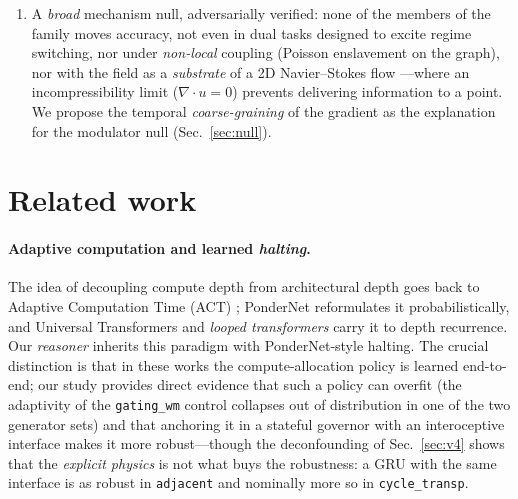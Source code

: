 \documentclass{article}
\begin{document}
\begin{enumerate}
        first campaign ($n{=}10$) in which the OOD compute-robustness effect
        survives a paired re-run with learnable physics after a
        numerical-precision bug (BF16 freezing), and a twenty-seed
        \emph{deconfounding} campaign that bounds the claim---at equalized caps
        the order effect holds in one generator family and not the other, and a
        matched-interface GRU governor attains it too
        (Secs.~\ref{sec:exp},~\ref{sec:v4}).
  \item A \emph{broad} mechanism null, adversarially verified: none of the members
        of the family moves accuracy, not even in dual tasks designed to excite
        regime switching, nor under \emph{non-local} coupling (Poisson
        enslavement on the graph), nor with the field as a \emph{substrate} of a
        2D Navier--Stokes flow ---where an incompressibility limit
        ($\nabla\!\cdot u{=}0$) prevents delivering information to a point.
        We propose the temporal \emph{coarse-graining} of the gradient as the
        explanation for the modulator null (Sec.~\ref{sec:null}).
\end{enumerate}

\section{Related work}
\label{sec:related}

\paragraph{Adaptive computation and learned \emph{halting}.}
The idea of decoupling compute depth from architectural depth goes back to
Adaptive Computation Time (ACT) \citep{graves2016act}; PonderNet
\citep{banino2021pondernet} reformulates it probabilistically, and Universal
Transformers \citep{dehghani2019universal} and \emph{looped transformers}
\citep{fan2025looped,giannou2023looped} carry it to depth recurrence. Our
\emph{reasoner} inherits this paradigm with PonderNet-style halting. The crucial
distinction is that in these works the compute-allocation policy is learned
end-to-end; our study provides direct evidence that such a policy can overfit
(the adaptivity of the \texttt{gating\_wm} control collapses out of distribution
in one of the two generator sets) and that anchoring it in a stateful governor
with an interoceptive interface makes it more robust---though the
deconfounding of Sec.~\ref{sec:v4} shows that the \emph{explicit physics} is
not what buys the robustness: a GRU with the same interface is as robust in
\texttt{adjacent} and nominally more so in \texttt{cycle\_transp}.
\end{document}
